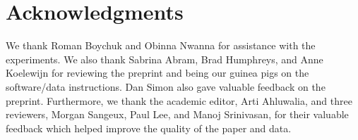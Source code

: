 \documentclass[fleqn,12pt]{wlpeerj}
\begin{document}
\section*{Acknowledgments}
%
We thank Roman Boychuk and Obinna Nwanna for assistance with the experiments.
We also thank Sabrina Abram, Brad Humphreys, and Anne Koelewijn for reviewing
the preprint and being our guinea pigs on the software/data instructions. Dan
Simon also gave valuable feedback on the preprint. Furthermore, we thank the
academic editor, Arti Ahluwalia, and three reviewers, Morgan Sangeux, Paul Lee,
and Manoj Srinivasan, for their valuable feedback which helped improve the
quality of the paper and data.


\end{document}

